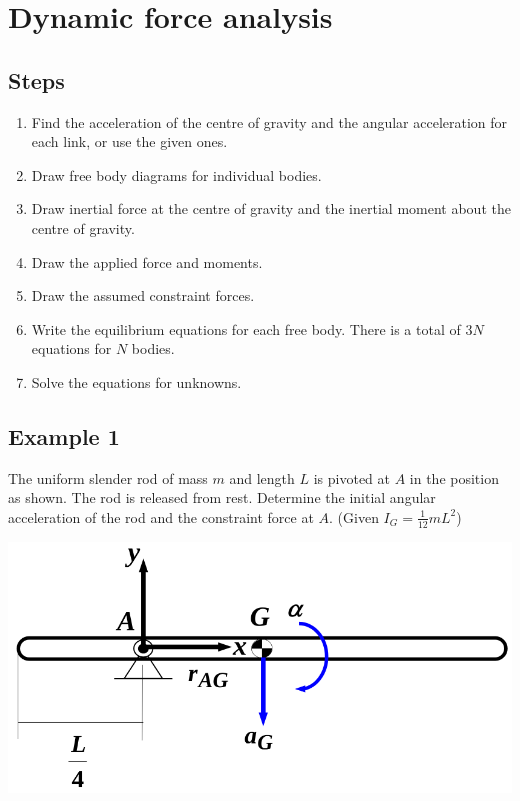 \documentclass[11pt]{article}
\begin{document}
\section{Dynamic force analysis}
\label{sec:orgaeaee27}

\subsection{Steps}
\label{sec:org41dd6ce}
\begin{enumerate}
\item Find the acceleration of the centre of gravity and the angular acceleration for each link, or use the given ones.
\item Draw free body diagrams for individual bodies.
\item Draw inertial force at the centre of gravity and the inertial moment about the centre of gravity.
\item Draw the applied force and moments.
\item Draw the assumed constraint forces.
\item Write the equilibrium equations for each free body. There is a total of \(3N\) equations for \(N\) bodies.
\item Solve the equations for unknowns.
\end{enumerate}
\subsection{Example 1}
\label{sec:orge19482b}
The uniform slender rod of mass \(m\) and length \(L\) is pivoted at \(A\) in the position as shown. The rod is released from rest. Determine the initial angular acceleration of the rod and the constraint force at \(A\). (Given \(I_G = \frac{1}{12} mL^2\))

\begin{center}
\includegraphics[width=.9\linewidth]{./images/dynamic-force-analysis-example-1-diagram.png}
\end{center}
\end{document}
